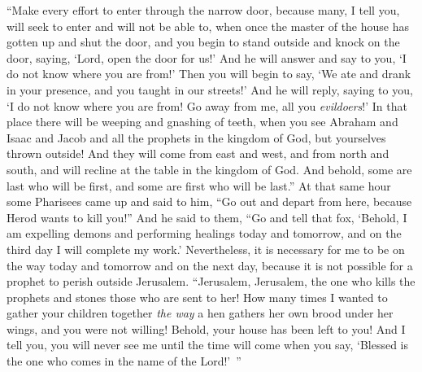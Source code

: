 \begin{biblechapter}
\verse “Make every effort to enter through the narrow door, because many, I tell you, will seek to enter and will not be able to,
\verse when once the master of the house has gotten up and shut the door, and you begin to stand outside and knock on the door, saying, ‘Lord, open the door for us!’ And he will answer and say to you, ‘I do not know where you are from!’
\verse Then you will begin to say, ‘We ate and drank in your presence, and you taught in our streets!’
\verse And he will reply, saying to you, ‘I do not know where you are from! Go away from me, all you \textit{evildoers}!’
\verse In that place there will be weeping and gnashing of teeth, when you see Abraham and Isaac and Jacob and all the prophets in the kingdom of God, but yourselves thrown outside!
\verse And they will come from east and west, and from north and south, and will recline at the table in the kingdom of God.
\verse And behold, some are last who will be first, and some are first who will be last.”
 At that same hour some Pharisees came up and said to him, “Go out and depart from here, because Herod wants to kill you!”
\verse And he said to them, “Go and tell that fox, ‘Behold, I am expelling demons and performing healings today and tomorrow, and on the third day I will complete my work.’
\verse Nevertheless, it is necessary for me to be on the way today and tomorrow and on the next day, because it is not possible for a prophet to perish outside Jerusalem.
\verse “Jerusalem, Jerusalem, the one who kills the prophets and stones those who are sent to her! How many times I wanted to gather your children together \textit{the way} a hen gathers her own brood under her wings, and you were not willing!
\verse Behold, your house has been left to you! And I tell you, you will never see me until the time will come when you say, ‘Blessed is the one who comes in the name of the Lord!’ ”
\end{biblechapter}

